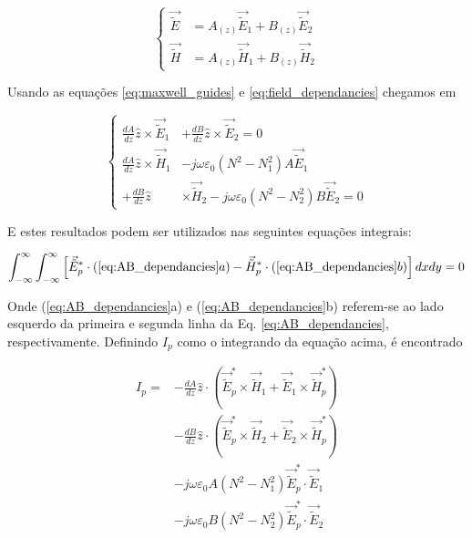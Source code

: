 \documentclass[final,12pt,times,twocolumn,authoryear]{elsarticle}
\newcommand{\tildee}{ \vec{\tilde{E}}}
\newcommand{\tildeh}{ \vec{\tilde{H}}}
\newcommand{\epsz}{\varepsilon_0}
\begin{document}
\begin{equation}\label{eq:field_dependancies}
\left\{
\begin{split}
\tildee &= A_{(z)}\tildee_1 + B_{(z)}\tildee_2 \\
\tildeh &= A_{(z)}\tildeh_1 + B_{(z)}\tildeh_2
\end{split}
\right.
\end{equation}

Usando as equações \ref{eq:maxwell_guides} e \ref{eq:field_dependancies} chegamos em

\begin{equation}\label{eq:AB_dependancies}
\left\{
\begin{split}
\frac{dA}{dz}\hat{z}\times\tildee_1 &+ \frac{dB}{dz}\hat{z}\times\tildee_2 = 0 \\
\frac{dA}{dz}\hat{z}\times\tildeh_1 &-j\omega\epsz\left(N^2-N_1^2\right)A\tildee_1 \\
+ \frac{dB}{dz}\hat{z}&\times\tildeh_2 -j\omega\epsz\left(N^2-N_2^2\right)B\tildee_2 = 0
\end{split}\right.
\end{equation}

E estes resultados podem ser utilizados nas seguintes equações integrais:

\begin{equation}\label{eq:integral_equations}
 \int_{-\infty}^\infty \int_{-\infty}^\infty \left[ \tildee_p^*\cdot (\ref{eq:AB_dependancies}a) - \tildeh_p^*\cdot(\ref{eq:AB_dependancies}b) \right] dxdy = 0
\end{equation}

Onde (\ref{eq:AB_dependancies}a) e (\ref{eq:AB_dependancies}b) referem-se ao lado esquerdo da primeira e segunda linha da Eq. \ref{eq:AB_dependancies}, respectivamente. Definindo $I_p$ como o integrando da equação acima, é encontrado

\begin{equation}\label{eq:I_p}
\begin{split}
I_p = &- \frac{dA}{dz}\hat{z}\cdot\left( \tildee_p^*\times\tildeh_1 + \tildee_1\times\tildeh_p^*\right) \\
& - \frac{dB}{dz}\hat{z}\cdot\left( \tildee_p^*\times\tildeh_2 + \tildee_2\times\tildeh_p^*\right) \\
& - j\omega\epsz A\left(N^2-N_1^2\right)\tildee_p^*\cdot\tildee_1 \\
& - j\omega\epsz B\left(N^2-N_2^2\right)\tildee_p^*\cdot\tildee_2
\end{split}
\end{equation}
\end{document}
